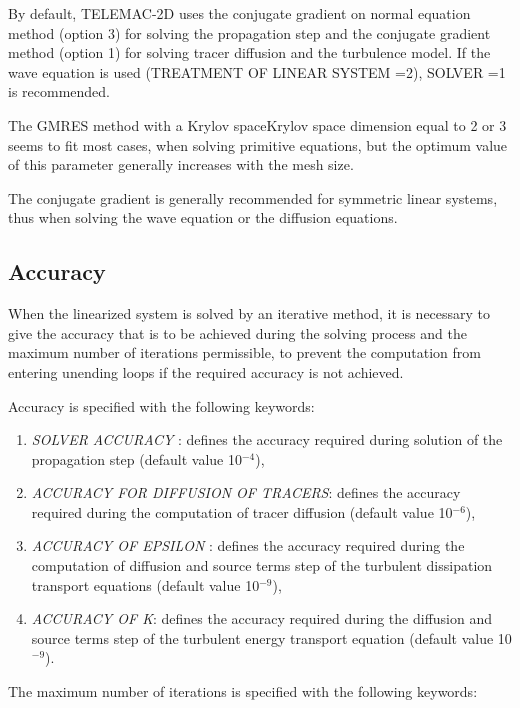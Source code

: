  By default, TELEMAC-2D uses the conjugate gradient on normal equation method (option 3) for solving the propagation step and the conjugate gradient method (option 1) for solving tracer diffusion and the turbulence model. If the wave equation is used (TREATMENT OF LINEAR SYSTEM =2), SOLVER =1 is recommended.

 The GMRES method with a Krylov spaceKrylov space dimension equal to 2 or 3 seems to fit most cases, when solving primitive equations, but the optimum value of this parameter generally increases with the mesh size.

 The conjugate gradient is generally recommended for symmetric linear systems, thus when solving the wave equation or the diffusion equations.


\subsection{ Accuracy}

 When the linearized system is solved by an iterative method, it is necessary to give the accuracy that is to be achieved during the solving process and the maximum number of iterations permissible, to prevent the computation from entering unending loops if the required accuracy is not achieved.

 Accuracy is specified with the following keywords:

\begin{enumerate}
\item  \textit{SOLVER ACCURACY} : defines the accuracy required during solution of the propagation step (default value 10${}^{-4}$),

\item  \textit{ACCURACY FOR DIFFUSION OF TRACERS}: defines the accuracy required during the computation of tracer diffusion (default value 10${}^{-6}$),

\item  \textit{ACCURACY OF EPSILON} : defines the accuracy required during the computation of diffusion and source terms step of the turbulent dissipation transport equations (default value 10${}^{-9}$),

\item  \textit{ACCURACY OF K}: defines the accuracy required during the diffusion and source terms step of the turbulent energy transport equation (default value 10${}^{-9}$).
\end{enumerate}

 The maximum number of iterations is specified with the following keywords:

